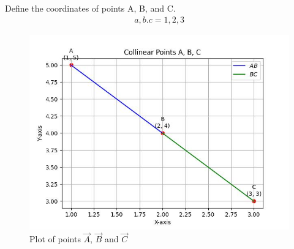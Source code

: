 \documentclass[journal]{IEEEtran}
\begin{document}
             Define the coordinates of points A, B, and C.
  \begin{align}
                a,b.c=1,2,3
  \end{align}
\begin{figure}[h!]
        \centering
        \includegraphics[width=0.7\linewidth]{Figs/Figure_1.jpg}
		\caption{Plot of points $\vec{A}$, $\vec{B}$ and $\vec{C}$}
        \label{stemplot}
\end{figure}
\end{document}
